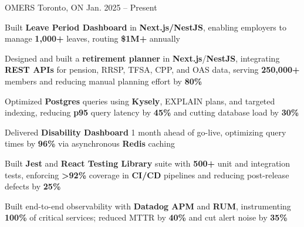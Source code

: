 \documentclass[11pt, a4paper]{awesome-cv}
\begin{document}
\makecvheader[C]


\begin{cventries}


  \cventry
    {\color{lightblue}{ASSOCIATE FULL-STACK ENGINEER}}
    {OMERS}
    {Toronto, ON}
    {Jan. 2025 -- Present}
    {
      \begin{cvitems}
        \item{Built \textbf{Leave Period Dashboard} in \textbf{Next.js/NestJS}, enabling employers to manage \textbf{1,000+} leaves, routing \textbf{\$1M+} annually}
        \item{Designed and built a \textbf{retirement planner} in \textbf{Next.js}/\textbf{NestJS}, integrating \textbf{REST APIs} for pension, RRSP, TFSA, CPP, and OAS data, serving \textbf{250,000+} members and reducing manual planning effort by \textbf{80\%}}
        \item{Optimized \textbf{Postgres} queries using \textbf{Kysely}, EXPLAIN plans, and targeted indexing, reducing \textbf{p95} query latency by \textbf{45\%} and cutting database load by \textbf{30\%}}
        \item{Delivered \textbf{Disability Dashboard} 1 month ahead of go-live, optimizing query times by \textbf{96\%} via asynchronous \textbf{Redis} caching}
        \item{Built \textbf{Jest} and \textbf{React Testing Library} suite with \textbf{500+} unit and integration tests, enforcing \textbf{>92\%} coverage in \textbf{CI/CD} pipelines and reducing post-release defects by \textbf{25\%}}
        \item{Built end-to-end observability with \textbf{Datadog APM} and \textbf{RUM}, instrumenting \textbf{100\%} of critical services; reduced MTTR by \textbf{40\%} and cut alert noise by \textbf{35\%}}
      \end{cvitems}
    }

  \vspace{3mm}


\end{cventries}
\end{document}
